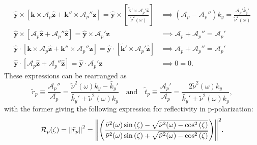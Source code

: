 \begin{subequations}
\begin{align}
 \mathbold{\hat{y}} \times \left[\mathbold{k} \times \mathcal{A}_p \mathbold{\hat{z}} + \mathbold{k''} \times \mathcal{A}_p'' \mathbold{\hat{z}} \right] = \mathbold{\hat{y}} \times \left[ \frac{\mathbold{\tilde{k}'}  \times \mathcal{A}_p' \mathbold{\hat{z}}}{\tilde{\nu}^2(\omega)} \right] &\implies \left( \mathcal{A}_p - \mathcal{A}_p'' \right) k_y = \frac{\mathcal{A}_p' \tilde{k_y}'}{\tilde{\nu}^2(\omega)} \\ 
 \mathbold{\hat{y}} \times \left[ \mathcal{A}_p \mathbold{\hat{z}} + \mathcal{A}_p'' \mathbold{\hat{z}} \right] = \mathbold{\hat{y}} \times \mathcal{A}_p' \mathbold{\hat{z}} &\implies \mathcal{A}_p + \mathcal{A}_p'' = \mathcal{A}_p' \\
 \mathbold{\hat{y}} \cdot \left[ \mathbold{k} \times \mathcal{A}_p \mathbold{\hat{z}} + \mathbold{k''} \times \mathcal{A}_p'' \mathbold{\hat{z}} \right] = \mathbold{\hat{y}} \cdot \left[\mathbold{\tilde{k}'}  \times \mathcal{A}_p' \mathbold{\hat{z}} \right] &\implies \mathcal{A}_p + \mathcal{A}_p'' = \mathcal{A}_p' \\
 \mathbold{\hat{y}} \cdot \left[ \mathcal{A}_p \mathbold{\hat{z}} + \mathcal{A}_p'' \mathbold{\hat{z}} \right] = \mathbold{\hat{y}} \cdot \mathcal{A}_p' \mathbold{\hat{z}} &\implies 0 = 0 .
 \end{align}
\end{subequations}
These expressions can be rearranged as
\begin{equation}\label{eq:p_coeff}
 \tilde{r}_p \equiv \frac{\mathcal{A}_p''}{\mathcal{A}_p} = \frac{\tilde{\nu}^2(\omega) k_y  - \tilde{k_y}'}{\tilde{k_y}' + \tilde{\nu}^2(\omega) k_y} \quad \text{and} \quad \tilde{t}_p \equiv \frac{\mathcal{A}_p'}{\mathcal{A}_p} = \frac{2 \tilde{\nu}^2(\omega) k_y}{\tilde{k_y}' + \tilde{\nu}^2(\omega) k_y} , 
 \end{equation}
with the former giving the following expression for reflectivity in p-polarization:
\begin{equation}\label{eq:p_reflectivity}
 \mathcal{R}_p (\zeta) = \norm{\tilde{r}_p}^2 = \norm{\left( \frac{\tilde{\nu}^2 (\omega) \sin \left( \zeta \right) - \sqrt{\tilde{\nu}^2 (\omega) - \cos^2 \left( \zeta \right)}}{\tilde{\nu}^2 (\omega) \sin \left( \zeta \right) + \sqrt{\tilde{\nu}^2 (\omega) - \cos^2 \left( \zeta \right)}} \right)}^2 .
 \end{equation}

